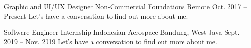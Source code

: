 \begin{cventries}

\cventry
{Graphic and UI/UX Designer} %
{Non-Commercial Foundations} %
{Remote} %
{Oct. 2017 -- Present} %
{ %
Let's have a conversation to find out more about me.
}






\cventry
{Software Engineer Internship} %
{Indonesian Aerospace} %
{Bandung, West Java} %
{Sept. 2019 -- Nov. 2019} %
{ %
Let's have a conversation to find out more about me.
}




\end{cventries}
